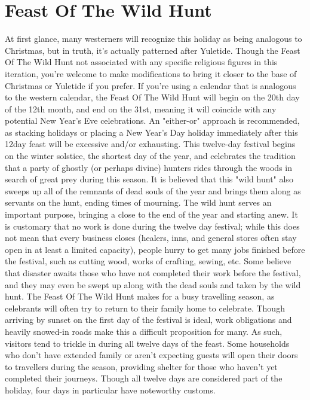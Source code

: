 \documentclass[10pt,a4paper,twoside,bg=print,twocolumn,openany,nodeprecatedcode]{dndbook}
\begin{document}
\section{Feast Of The Wild Hunt}
At first glance, many westerners will recognize this holiday as being analogous to Christmas, but in truth, it's actually patterned after Yuletide. Though the Feast Of The Wild Hunt not associated with any specific religious figures in this iteration, you're welcome to make modifications to bring it closer to the base of Christmas or Yuletide if you prefer. If you're using a calendar that is analogous to the western calendar, the Feast Of The Wild Hunt will begin on the 20th day of the 12th month, and end on the 31st, meaning it will coincide with any potential New Year's Eve celebrations. An "either-or" approach is recommended, as stacking holidays or placing a New Year's Day holiday immediately after this 12day feast will be excessive and/or exhausting.
This twelve-day festival begins on the winter solstice, the shortest day of the year, and celebrates the tradition that a party of ghostly (or perhaps divine) hunters rides through the woods in search of great prey during this season. It is believed that this "wild hunt" also sweeps up all of the remnants of dead souls of the year and brings them along as servants on the hunt, ending times of mourning. The wild hunt serves an important purpose, bringing a close to the end of the year and starting anew.
It is customary that no work is done during the twelve day festival; while this does not mean that every business closes (healers, inns, and general stores often stay open in at least a limited capacity), people hurry to get many jobs finished before the festival, such as cutting wood, works of crafting, sewing, etc. Some believe that disaster awaits those who have not completed their work before the festival, and they may even be swept up along with the dead souls and taken by the wild hunt. The Feast Of The Wild Hunt makes for a busy travelling season, as celebrants will often try to return to their family home to celebrate. Though arriving by sunset on the first day of the festival is ideal, work obligations and heavily snowed-in roads make this a difficult proposition for many. As such, visitors tend to trickle in during all twelve days of the feast. Some households who don't have extended family or aren't expecting guests will open their doors to travellers during the season, providing shelter for those who haven't yet completed their journeys. Though all twelve days are considered part of the holiday, four days in particular have noteworthy customs.
\end{document}
